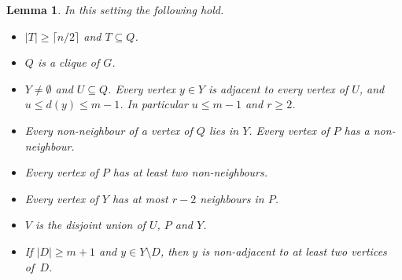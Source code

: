 \documentclass[11pt,a4paper]{article}
\newtheorem{lemma}[theorem]{Lemma}
\theoremstyle{remark}
\newcommand{\ceil}[1]{\lceil #1\rceil}
\begin{document}
\begin{lemma}\label{lem:structure}
In this setting the following hold.
\begin{itemize}
\item[(a)] $|T|\ge\ceil{n/2}$ and $T\subseteq Q$.
\item[(b)] $Q$ is a clique of $G$.
\item[(c)] $Y\neq\emptyset$ and $U\subseteq Q$. Every vertex $y\in Y$ is adjacent to every vertex
  of $U$, and $u\le d(y)\le m-1$. In particular $u\le m-1$ and $r\ge 2$.
\item[(d)] Every non-neighbour of a vertex of $Q$ lies in $Y$. Every vertex of $P$ has a
  non-neighbour.
\item[(e)] Every vertex of $P$ has at least two non-neighbours.
\item[(f)] Every vertex of $Y$ has at most $r-2$ neighbours in $P$.
\item[(g)] $V$ is the disjoint union of $U$, $P$ and $Y$.
\item[(h)] If $|D|\ge m+1$ and $y\in Y\setminus D$, then $y$ is non-adjacent to at least two
  vertices of~$D$.
\end{itemize}
\end{lemma}
\end{document}

